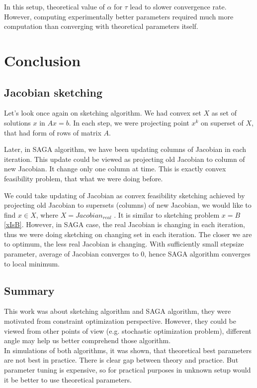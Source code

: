 \documentclass[11pt]{book}
\theoremstyle{definition}
\begin{document}
	In this setup, theoretical value of $\alpha$ for $\tau$ lead to slower convergence rate. However, computing experimentally better parameters required much more computation than converging with theoretical parameters itself.
	
	\chapter{Conclusion}
	
	\section{Jacobian sketching}
	
	Let's look once again on sketching algorithm. We had convex set $X$ as set of solutions $x$ in $Ax=b$. In each step, we were projecting point $x^k$ on superset of $X$, that had form of rows of matrix $A$.
	
	Later, in SAGA algorithm, we have been updating columns of Jacobian in each iteration. This update could be viewed as projecting old Jacobian to column of new Jacobian. It change only one column at time. This is exactly convex feasibility problem, that what we were doing before.
	
	We could take updating of Jacobian as convex feasibility sketching achieved by projecting old Jacobian to supersets (columns) of new Jacobian, we would like to find $x \in X$, where $X=Jacobian_{real}$ \cite{jacobianSketching}. It is similar to sketching problem $x=B$ \ref{xIsB}. However, in SAGA case, the real Jacobian is changing in each iteration, thus we were doing sketching on changing set in each iteration. The closer we are to optimum, the less real Jacobian is changing. With sufficiently small stepsize parameter, average of Jacobian converges to $0$, hence SAGA algorithm converges to local minimum.
	
	
	\section{Summary}
	This work was about sketching algorithm and SAGA algorithm, they were motivated from constraint optimization perspective. However, they could be viewed from other points of view (e.g. stochastic optimization problem), different angle may help us better comprehend those algorithm.\\
	
	In simulations of both algorithms, it was shown, that theoretical best parameters are not best in practice. There is clear gap between theory and practice. But parameter tuning is expensive, so for practical purposes in unknown setup would it be better to use theoretical parameters.
	
\end{document}

